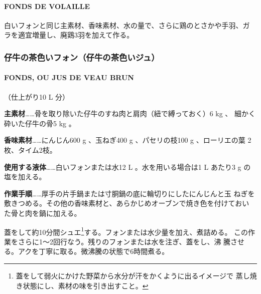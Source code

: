 \documentclass[twoside,12Q,b5j]{escoffierltjsbook}
\newenvironment{recette}{\begin{multicols}{2}}{\end{multicols}}
\begin{document}
\begin{recette}
\paragraph{FONDS DE VOLAILLE}\label{fonds-de-volaille}


白いフォンと同じ主素材、香味素材、水の量で、さらに鶏のとさかや手羽、ガ
ラを適宜増量し、廃鶏3羽を加えて作る。

\vspace*{2\zw}

\subsubsection{仔牛の茶色いフォン（仔牛の茶色いジュ）}\label{ux4ed4ux725bux306eux8336ux8272ux3044ux30d5ux30a9ux30f3ux4ed4ux725bux306eux8336ux8272ux3044ux30b8ux30e5}

\paragraph{FONDS, OU JUS DE VEAU BRUN}\label{fonds-ou-jus-de-veau-brun}


（仕上がり10 L 分）

\textbf{主素材}\ldots{}\ldots{}骨を取り除いた仔牛のすね肉と肩肉（紐で縛っておく）6
kg 、 細かく砕いた仔牛の骨5 kg 。

\textbf{香味素材}\ldots{}\ldots{}にんじん600 g 、玉ねぎ400 g
、パセリの枝100 g 、ローリエの葉 2枚、タイム2枝。

\textbf{使用する液体}\ldots{}\ldots{}白いフォンまたは水12 L
。水を用いる場合は1 L あたり3 g の塩を加える。

\textbf{作業手順}\ldots{}\ldots{}厚手の片手鍋または寸胴鍋の底に輪切りにしたにんじんと玉
ねぎを敷きつめる。その他の香味素材と、あらかじめオーブンで焼き色を付けておい
た骨と肉を鍋に加える。

蓋をして約10分間シュエ\footnote{蓋をして弱火にかけた野菜から水分が汗をかくように出るイメージで
  蒸し焼き状態にし、素材の味を引き出すこと。}する。フォンまたは水少量を加え、煮詰める。
この作業をさらに1〜2回行なう。残りのフォンまたは水を注ぎ、蓋をし、沸
騰させる。アクを丁寧に取る。微沸騰の状態で6時間煮る。


\end{recette}
\end{document}

